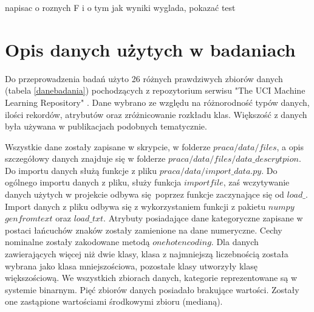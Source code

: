  napisac o roznych F i o tym jak wyniki wyglada, pokazać test

\section{Opis danych użytych w badaniach}
Do przeprowadzenia badań użyto 26 różnych prawdziwych zbiorów danych (tabela \ref{danebadania}) pochodzących z repozytorium serwisu "The UCI Machine Learning Repository" \cite{uci}. Dane wybrano ze względu na różnorodność typów danych, ilości rekordów, atrybutów oraz zróżnicowanie rozkładu klas. Większość z danych była używana w publikacjach podobnych tematycznie\cite{hyper}\cite{StefImbalanced}. \par
Wszystkie dane zostały zapisane w skrypcie, w folderze $praca/data/files$, a opis szczegółowy danych znajduje się w folderze $praca/data/files/data\_descrytpion$. Do importu danych służą funkcje z pliku $praca/data/import\_data.py$. Do ogólnego importu danych z pliku, służy funkcja $importfile$, zaś wczytywanie danych użytych w projekcie odbywa się poprzez funkcje zaczynające się od $load\_$. Import danych z pliku odbywa się z wykorzystaniem funkcji z pakietu $numpy$ $genfromtext$ oraz $load\_txt$. Atrybuty posiadające dane kategoryczne zapisane w postaci łańcuchów znaków zostały zamienione na dane numeryczne. Cechy nominalne zostały zakodowane metodą $one hot encoding$. Dla danych zawierających więcej niż dwie klasy, klasa z najmniejszą liczebnością została wybrana jako klasa mniejszościowa, pozostałe klasy utworzyły klasę większościową. We wszystkich zbiorach danych, kategorie reprezentowane są w systemie binarnym. Pięć zbiorów danych posiadało brakujące wartości. Zostały one zastąpione wartościami środkowymi zbioru (medianą).
